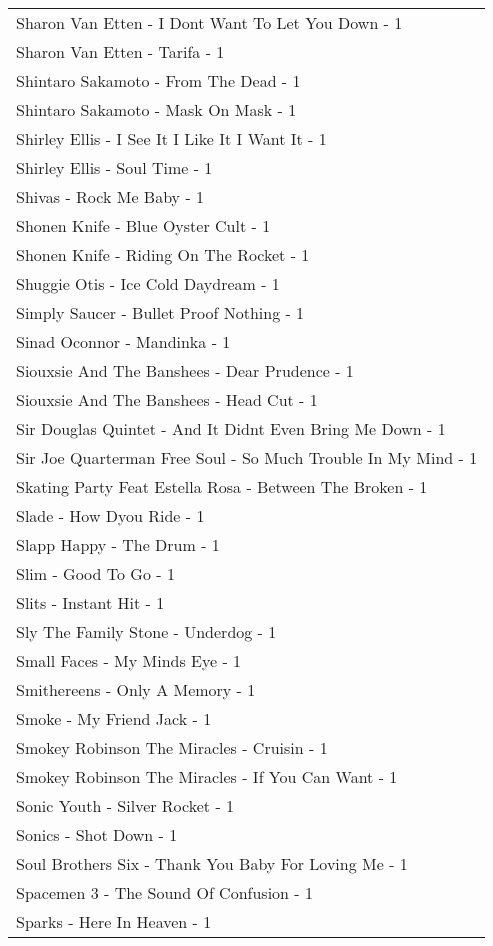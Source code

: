 \documentclass[
]{article}
\begin{document}
\begin{longtable}{l}
Sharon Van Etten - I Dont Want To Let You Down - 1 \\ 
Sharon Van Etten - Tarifa - 1 \\ 
Shintaro Sakamoto - From The Dead - 1 \\ 
Shintaro Sakamoto - Mask On Mask - 1 \\ 
Shirley Ellis - I See It I Like It I Want It - 1 \\ 
Shirley Ellis - Soul Time - 1 \\ 
Shivas - Rock Me Baby - 1 \\ 
Shonen Knife - Blue Oyster Cult - 1 \\ 
Shonen Knife - Riding On The Rocket - 1 \\ 
Shuggie Otis - Ice Cold Daydream - 1 \\ 
Simply Saucer - Bullet Proof Nothing - 1 \\ 
Sinad Oconnor - Mandinka - 1 \\ 
Siouxsie And The Banshees - Dear Prudence - 1 \\ 
Siouxsie And The Banshees - Head Cut - 1 \\ 
Sir Douglas Quintet - And It Didnt Even Bring Me Down - 1 \\ 
Sir Joe Quarterman Free Soul - So Much Trouble In My Mind - 1 \\ 
Skating Party Feat Estella Rosa - Between The Broken - 1 \\ 
Slade - How Dyou Ride - 1 \\ 
Slapp Happy - The Drum - 1 \\ 
Slim - Good To Go - 1 \\ 
Slits - Instant Hit - 1 \\ 
Sly The Family Stone - Underdog - 1 \\ 
Small Faces - My Minds Eye - 1 \\ 
Smithereens - Only A Memory - 1 \\ 
Smoke - My Friend Jack - 1 \\ 
Smokey Robinson The Miracles - Cruisin - 1 \\ 
Smokey Robinson The Miracles - If You Can Want - 1 \\ 
Sonic Youth - Silver Rocket - 1 \\ 
Sonics - Shot Down - 1 \\ 
Soul Brothers Six - Thank You Baby For Loving Me - 1 \\ 
Spacemen 3 - The Sound Of Confusion - 1 \\ 
Sparks - Here In Heaven - 1 \\ 

\end{longtable}
\end{document}
